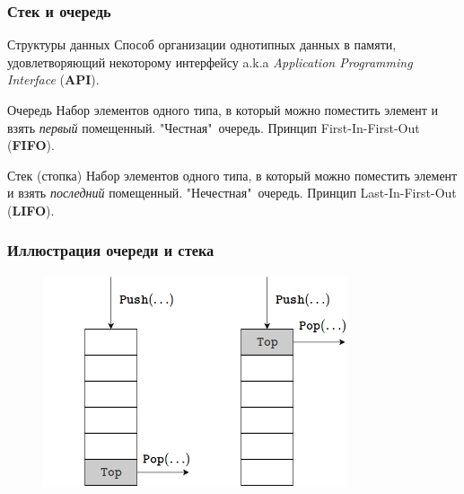 \documentclass{beamer}
\begin{document}
    \begin{frame}
        \frametitle{Стек и очередь}
        \begin{block}{Структуры данных}
            \justifying
            Способ организации однотипных данных в памяти, удовлетворяющий некоторому интерфейсу a.k.a {\it Application Programming Interface} ({\bf API}).
        \end{block}
        \begin{block}{Очередь}
            \justifying
            Набор элементов одного типа, в который можно поместить элемент и взять {\it первый} помещенный. "Честная"\ очередь. Принцип First-In-First-Out ({\bf FIFO}).
        \end{block}
        \begin{block}{Стек (стопка)}
            \justifying
            Набор элементов одного типа, в который можно поместить элемент и взять {\it последний} помещенный. "Нечестная"\ очередь. Принцип Last-In-First-Out ({\bf LIFO}).
        \end{block}
    \end{frame}
    \begin{frame}
        \frametitle{Иллюстрация очереди и стека}
        \begin{figure}[!tbp]
           \centering
           \includegraphics[width=0.8\textwidth]{pics/sq.png}
       \end{figure}
    \end{frame}
\end{document}
